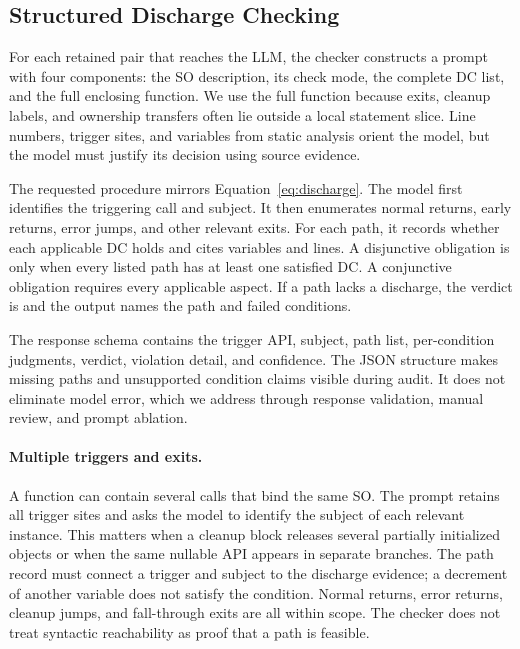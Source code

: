 \subsection{Structured Discharge Checking}

For each retained pair that reaches the LLM, the checker constructs a prompt with four components:
the SO description, its check mode, the complete DC list, and the full
enclosing function. We use the full function because exits, cleanup labels,
and ownership transfers often lie outside a local statement slice. Line
numbers, trigger sites, and variables from static analysis orient the model,
but the model must justify its decision using source evidence.

The requested procedure mirrors Equation~\ref{eq:discharge}. The model first
identifies the triggering call and subject. It then enumerates normal returns,
early returns, error jumps, and other relevant exits. For each path, it records
whether each applicable DC holds and cites variables and lines. A disjunctive
obligation is  only when every listed path has at least one
satisfied DC. A conjunctive obligation requires every applicable aspect. If a
path lacks a discharge, the verdict is  and the output names the
path and failed conditions.

The response schema contains the trigger API, subject, path list, per-condition
judgments, verdict, violation detail, and confidence. The JSON structure makes
missing paths and unsupported condition claims visible during audit. It does
not eliminate model error, which we address through response validation,
manual review, and prompt ablation.

\paragraph{Multiple triggers and exits.}
A function can contain several calls that bind the same SO. The prompt retains
all trigger sites and asks the model to identify the subject of each relevant
instance. This matters when a cleanup block releases several partially
initialized objects or when the same nullable API appears in separate
branches. The path record must connect a trigger and subject to the discharge
evidence; a decrement of another variable does not satisfy the condition.
Normal returns, error returns, cleanup jumps, and fall-through exits are all
within scope. The checker does not treat syntactic reachability as proof that a
path is feasible.

